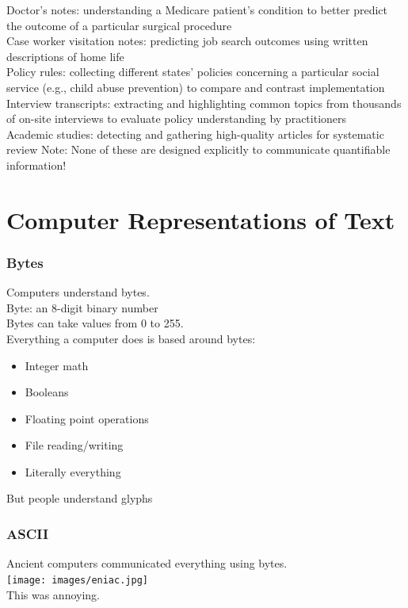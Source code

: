 \documentclass[smaller,xcolor=table,aspectratio=169]{beamer}
\begin{document}
\begin{frame}[t]
	Doctor's notes:  understanding a Medicare patient's condition to better predict the outcome of a particular surgical procedure\\
	Case worker visitation notes:  predicting job search outcomes using written descriptions of home life\\
	Policy rules:  collecting different states' policies concerning a particular social service (e.g., child abuse prevention) to compare and contrast implementation\\
	Interview transcripts:  extracting and highlighting common topics from thousands of on-site interviews to evaluate policy understanding by practitioners\\
	Academic studies:  detecting and gathering high-quality articles for systematic review
	\vfill{}
	Note: None of these are designed explicitly to communicate quantifiable information!
\end{frame}




						\section{Computer Representations of Text}

						\begin{frame}
							\frametitle{Bytes}
							Computers understand bytes.\\\pause{}
							Byte: an 8-digit binary number\\\pause{}
							Bytes can take values from 0 to 255.\\\pause{}
							Everything a computer does is based around bytes:\\\pause{}
							\begin{itemize}
								\item Integer math
								\item Booleans
								\item Floating point operations
								\item File reading/writing
								\item Literally everything
							\end{itemize}
							But people understand glyphs
						\end{frame}

						\begin{frame}
							\frametitle{ASCII}
							Ancient computers communicated everything using bytes.\\
							\texttt{[image: images/eniac.jpg]}\pause{}\\
							This was annoying.
						\end{frame}
\end{document}
